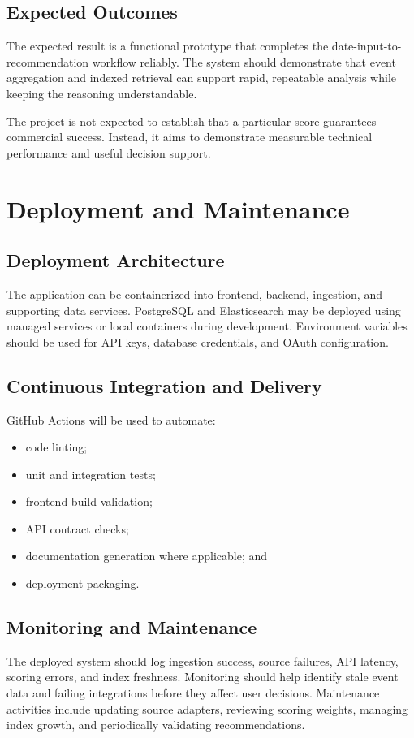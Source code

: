 \documentclass[12pt]{article}
\begin{document}
\subsection{Expected Outcomes}
The expected result is a functional prototype that completes the date-input-to-recommendation workflow reliably. The system should demonstrate that event aggregation and indexed retrieval can support rapid, repeatable analysis while keeping the reasoning understandable.

The project is not expected to establish that a particular score guarantees commercial success. Instead, it aims to demonstrate measurable technical performance and useful decision support.

\section{Deployment and Maintenance}

\subsection{Deployment Architecture}
The application can be containerized into frontend, backend, ingestion, and supporting data services. PostgreSQL and Elasticsearch may be deployed using managed services or local containers during development. Environment variables should be used for API keys, database credentials, and OAuth configuration.

\subsection{Continuous Integration and Delivery}
GitHub Actions will be used to automate:
\begin{itemize}[leftmargin=0.7cm]
\item code linting;
\item unit and integration tests;
\item frontend build validation;
\item API contract checks;
\item documentation generation where applicable; and
\item deployment packaging.
\end{itemize}

\subsection{Monitoring and Maintenance}
The deployed system should log ingestion success, source failures, API latency, scoring errors, and index freshness. Monitoring should help identify stale event data and failing integrations before they affect user decisions. Maintenance activities include updating source adapters, reviewing scoring weights, managing index growth, and periodically validating recommendations.
\end{document}
